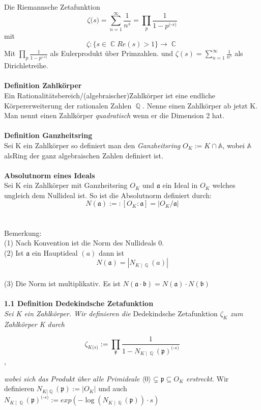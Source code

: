 \documentclass[10pt,a4paper]{article}
\DeclareMathOperator{\C}{\mathbb{C}}
\DeclareMathOperator{\Q}{\mathbb{Q}}
\begin{document}
Die Riemannsche Zetafunktion  $$\zeta \textit{(s)}= \sum_{n = 1}^\infty  \frac{1}{n^s} =  \prod_{\textit{p}} \frac{1}{1-\textit{p}^\textit{(-s)}} $$ mit  $$ \zeta : \{\textit{s} \in \C Re(\textit{s}) > 1\}\rightarrow \C$$ 
Mit $\prod_{\textit{p}} \frac{1}{1-\textit{p}^\textit{(-s)}}$ als Eulerprodukt über Primzahlen. und $\zeta (\textit{s}) = \sum_{n = 1}^\infty  \frac{1}{n^s} $ als Dirichletreihe.
\\
\\
\textbf{Definition Zahlkörper}
\\
Ein Rationalitätsbereich/(algebraischer)Zahlkörper ist eine endliche Körpererweiterung der rationalen Zahlen $\Q$.
Nenne einen Zahlkörper ab jetzt K. Man nennt einen Zahlkörper \textit{quadratisch} wenn er die Dimension 2 hat. 
\\
\\
\textbf{Definition Ganzheitsring}
\\
Sei K ein Zahlkörper so definiert man den \textit{Ganzheitsring} $O_{K} := K \cap \mathbb{A}$, wobei $\mathbb{A}$ alsRing der ganz algebraischen Zahlen definiert ist.
\\
\\
\textbf{Absolutnorm eines Ideals}
\\
Sei K ein Zahlkörper mit Ganzheitsring $O_{K}$ und $\mathfrak{a}$ ein Ideal in $O_{K}$ welches ungleich dem Nullideal ist. So ist die Absolutnorm definiert durch: $$N(\mathfrak{a}) :=\colon [O_{K} : \mathfrak{a} ] = \vert O_{K} / \mathfrak{a} \vert $$
\\
\\
Bemerkung: 
\\
(1) Nach Konvention ist die Norm des Nullideals 0.
\\
(2) Ist $\mathfrak{a}$ ein Hauptideal $(a)$ dann ist $$N(\mathfrak{a}) = |N_{K\mid \Q}(a)|$$
\\
(3) Die Norm ist multiplikativ. Es ist $N(\mathfrak{a}\cdot \mathfrak{b}) = N(\mathfrak{a})\cdot N(\mathfrak{b})$
\\
\\
\textbf{1.1 Definition Dedekindsche Zetafunktion}
	\\ 
\textit{Sei K ein Zahlkörper. Wir definieren die} Dedekindsche Zetafunktion \textit{$\zeta_{\textit{K}}$ zum Zahlkörper K durch}
	
$$\zeta_{\textit{K} \textit{(s)}}:= \prod_{\mathfrak{p}}\frac{1}{1- N_{\textit{K}\mid\Q}(\mathfrak{p})^\textit{(-s)}}$$, 
	
\textit{wobei sich das Produkt über alle Primideale} $\langle0\rangle\subsetneq \mathfrak{p} \subseteq O_{\textit{K}}$ \textit{erstreckt}. Wir definieren $N_{\textit{K}|\Q}(\mathfrak{p}) := | O_{\textit{K}}|$ und auch $N_{\textit{K}\mid\Q}(\mathfrak{p})^\textit{(-s)}:=exp(-\log(N_{\textit{K}\mid\Q}(\mathfrak{p}))\cdot \textit{s})$
\end{document}
